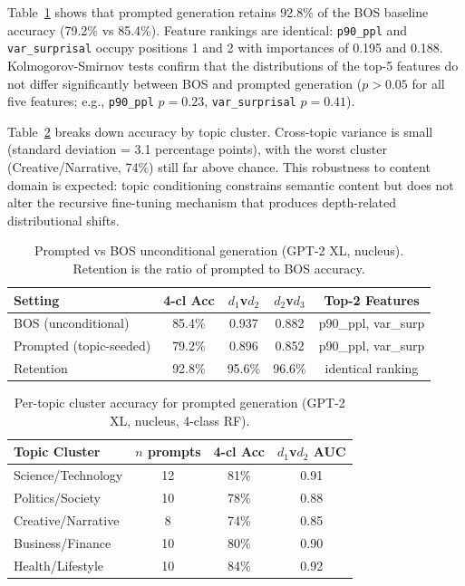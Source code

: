 \documentclass[11pt,a4paper]{article}
\begin{document}
Table~\ref{tab:prompted} shows that prompted generation retains 92.8\% of the BOS baseline accuracy (79.2\% vs 85.4\%). Feature rankings are identical: \texttt{p90\_ppl} and \texttt{var\_surprisal} occupy positions 1 and 2 with importances of 0.195 and 0.188. Kolmogorov-Smirnov tests confirm that the distributions of the top-5 features do not differ significantly between BOS and prompted generation ($p > 0.05$ for all five features; e.g., \texttt{p90\_ppl} $p = 0.23$, \texttt{var\_surprisal} $p = 0.41$).

Table~\ref{tab:topics} breaks down accuracy by topic cluster. Cross-topic variance is small (standard deviation = 3.1 percentage points), with the worst cluster (Creative/Narrative, 74\%) still far above chance. This robustness to content domain is expected: topic conditioning constrains semantic content but does not alter the recursive fine-tuning mechanism that produces depth-related distributional shifts.

\begin{table}[t]
\centering
\caption{Prompted vs BOS unconditional generation (GPT-2 XL, nucleus). Retention is the ratio of prompted to BOS accuracy.}
\label{tab:prompted}
\small
\begin{tabular}{lcccc}
\toprule
\textbf{Setting} & \textbf{4-cl Acc} & \textbf{$d_1$v$d_2$} & \textbf{$d_2$v$d_3$} & \textbf{Top-2 Features} \\
\midrule
BOS (unconditional) & 85.4\% & 0.937 & 0.882 & p90\_ppl, var\_surp \\
Prompted (topic-seeded) & 79.2\% & 0.896 & 0.852 & p90\_ppl, var\_surp \\
\midrule
Retention & 92.8\% & 95.6\% & 96.6\% & identical ranking \\
\bottomrule
\end{tabular}
\end{table}

\begin{table}[t]
\centering
\caption{Per-topic cluster accuracy for prompted generation (GPT-2 XL, nucleus, 4-class RF).}
\label{tab:topics}
\small
\begin{tabular}{lccc}
\toprule
\textbf{Topic Cluster} & \textbf{$n$ prompts} & \textbf{4-cl Acc} & \textbf{$d_1$v$d_2$ AUC} \\
\midrule
Science/Technology & 12 & 81\% & 0.91 \\
Politics/Society & 10 & 78\% & 0.88 \\
Creative/Narrative & 8 & 74\% & 0.85 \\
Business/Finance & 10 & 80\% & 0.90 \\
Health/Lifestyle & 10 & 84\% & 0.92 \\
\bottomrule
\end{tabular}
\end{table}
\end{document}
